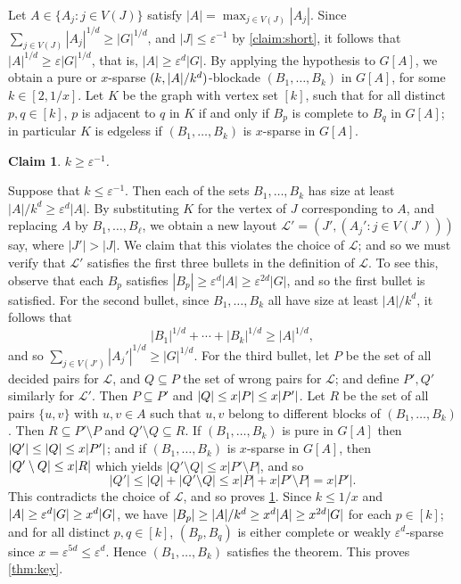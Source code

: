 \documentclass[11pt,reqno,a4paper]{amsart}
\newtheorem{claim}{Claim}[theorem]
\let\oldendproof\endproof
\renewenvironment{proof}[1][\proofname]{%
	\oldproof[\normalfont\bfseries #1]%
}{\oldendproof}
\renewcommand{\qedsymbol}{$\blacksquare$}%
\newenvironment{subproof}[1][\normalfont\it Subproof]{%
	\renewcommand{\qedsymbol}{$\square$}%
	\begin{proof}[#1]%
	}{%
	\end{proof}%
}
\newcommand{\eps}{\varepsilon}
\renewcommand{\subset}{\subseteq}
\DeclarePairedDelimiter\abs{\lvert}{\rvert}%
\begin{document}
\begin{proof}
		Let $A\in\{A_j:j\in V(J)\}$ satisfy $|A|=\max_{j\in V(J)} |A_j|$. Since $\sum_{j\in V(J)}|A_j|^{1/d}\ge |G|^{1/d}$,
		and $|J|\le \eps^{-1}$ by \cref{claim:short}, it follows that
		$|A|^{1/d}\ge \eps|G|^{1/d}$, that is, 
		$|A|\ge \eps^{d}|G|$.
		By applying the hypothesis to
		$G[A]$,
		we obtain a pure or $x$-sparse $(k,\abs{A}/k^d)$-blockade $(B_1,\ldots, B_{k})$ in $G[A]$, for some $k\in[2,1/x]$.
		Let $K$ be the graph with vertex set $[k]$, such that for all distinct $p,q\in[k]$, $p$ is adjacent to $q$ in $K$ if and only if $B_p$ is complete to $B_q$ in $G[A]$; in particular $K$ is edgeless if $(B_1,\ldots,B_{k})$ is $x$-sparse in $G[A]$.
		\begin{claim}
			\label{claim:long}
			$k\ge \eps^{-1}$.
		\end{claim}
		\begin{subproof}
			Suppose that $k\le \eps^{-1}$. Then each of the sets $B_1,\ldots, B_{k}$ has size at least
			$|A|/k^d\ge \eps^{d} |A|$.
			By substituting $K$ for
			the vertex of $J$ corresponding to $A$, and replacing $A$ by $B_1,\ldots, B_\ell$, we obtain a new layout $\mathcal{L}'=(J', (A_j':j\in V(J')))$ say,
			where $|J'|>|J|$.
			We claim that this violates the choice of $\mathcal{L}$; and so we must verify that $\mathcal{L}'$ satisfies the
			first three bullets in the definition of $\mathcal{L}$. 
			To see this, observe that each $B_p$ satisfies
			$|B_p|\ge \eps^{d} |A|\ge \eps^{2d} |G|$,
			and so the first bullet is satisfied.
			For the second bullet, since $B_1,\ldots, B_{k}$ all have size at least $|A|/k^d$, it follows that
			$$|B_1|^{1/d}+\cdots+|B_{k}|^{1/d}\ge |A|^{1/d},$$
			and so $\sum_{j\in V(J')}|A_j'|^{1/d}\ge |G|^{1/d}$.
			For the third bullet, let
			$P$ be the set of all decided pairs for $\mathcal{L}$, and $Q\subseteq P$ the set of wrong pairs for $\mathcal{L}$;
			and define $P',Q'$ similarly for $\mathcal{L}'$. Then $P\subset P'$ and $|Q|\le x|P|\le x\abs{P'}$. Let $R$ be the
			set of all pairs $\{u,v\}$ with $u,v\in A$ such that $u,v$ belong to different blocks
			of $(B_1,\ldots, B_k)$. Then $R\subseteq  P'\setminus P$ and $Q'\setminus Q\subseteq R$.
			If $(B_1,\ldots,B_k)$ is pure in $G[A]$ then $\abs{Q'}\le\abs Q\le x\abs{P'}$;
			and if $(B_1,\ldots, B_k)$ is $x$-sparse in $G[A]$, then $\abs{Q'\setminus Q}\le x\abs R$ which yields
			$|Q'\setminus Q|\le x|P'\setminus P|$, and so
			$$|Q'|\le |Q|+|Q'\setminus Q|\le x|P|+ x|P'\setminus P|= x|P'|.$$
			This contradicts the choice of $\mathcal{L}$, and so proves \cref{claim:long}.
		\end{subproof}
		Since $k\le1/x$ and $\abs A\ge\eps^d\abs G\ge x^d\abs G$, we have $\abs{B_p}\ge \abs A/k^d\ge x^d\abs A\ge x^{2d}\abs G$ for each $p\in[k]$;
		and for all distinct $p,q\in[k]$,
		$(B_p,B_q)$ is either complete or weakly $\eps^d$-sparse since $x=\eps^{5d}\le \eps^d$.
		Hence $(B_1,\ldots,B_k)$ satisfies the theorem.
		This proves \cref{thm:key}.
	\end{proof}
\end{document}
